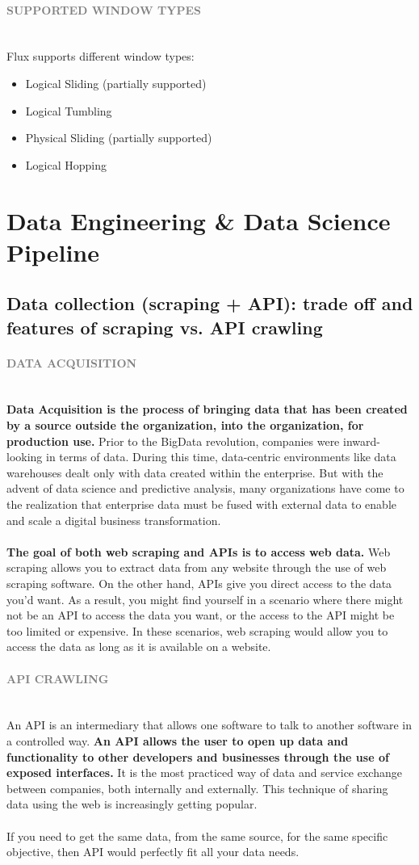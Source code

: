 \documentclass[10pt,a4paper]{article}
\newcommand{\nline}{\\~\\}
\newcommand{\myparagraph}[1]{\paragraph{\normalsize{\textcolor{gray}{\uppercase{\textbf{#1}}}} }\mbox{} \vspace{0.5em}\\}
\begin{document}
\myparagraph{Supported Window Types}
Flux supports different window types:
\begin{itemize}
	\item Logical Sliding (partially supported)
	\item Logical Tumbling
	\item Physical Sliding (partially supported)
	\item Logical Hopping
\end{itemize}
\section{Data Engineering \& Data Science Pipeline}
\subsection{Data collection (scraping + API): trade off and features of scraping vs. API crawling}
\myparagraph{Data Acquisition}
\textbf{Data Acquisition is the process of bringing data that has been created by a source outside the organization, into the organization, for production use. }Prior to the BigData revolution, companies were inward-looking in terms of data. During this time, data-centric environments like data warehouses dealt only with data created within the enterprise. But with the advent of data science and predictive analysis, many organizations have come to the realization that enterprise data must be fused with external data to enable and scale a digital business transformation.
\nline
\textbf{The goal of both web scraping and APIs is to access web data.}
Web scraping allows you to extract data from any website through the use of web scraping software. On the other hand, APIs give you direct access to the data you’d want. As a result, you might find yourself in a scenario where there might not be an API to access the data you want, or the access to the API might be too limited or expensive. In these scenarios, web scraping would allow you to access the data as long as it is available on a website.
\myparagraph{API crawling}
An API is an intermediary that allows one software to talk to another software in a controlled way. \textbf{An API allows the user to open up data and functionality to other developers and businesses through the use of exposed interfaces.} It is the most practiced way of data and service exchange between companies, both internally and externally. This technique of sharing data using the web is increasingly getting popular. 
\nline
If you need to get the same data, from the same source, for the same specific objective, then API would perfectly fit all your data needs. 
\end{document}
